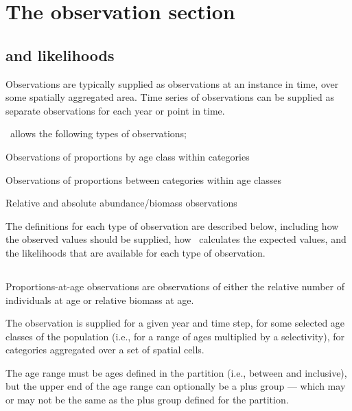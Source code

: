 \section{The observation section\label{sec:observation-section}}

\subsection{ and likelihoods\label{sec:likelihoods}}

Observations are typically supplied as observations at an instance in time, over some spatially aggregated area. Time series of observations can be supplied as separate observations for each year or point in time. 

\SPM\ allows the following types of observations;

\begin{description}
  \item Observations of proportions by age class within categories
  \item Observations of proportions between categories within age classes
  \item Relative and absolute abundance/biomass observations
\end{description}

The definitions for each type of observation are described below, including how the observed values should be supplied, how \SPM\ calculates the expected values, and the likelihoods that are available for each type of observation.

\subsection{}

Proportions-at-age observations are observations of either the relative number of individuals at age or relative biomass at age. 

The observation is supplied for a given year and time step, for some selected age classes of the population (i.e., for a range of ages multiplied by a selectivity), for categories aggregated over a set of spatial cells. 

The age range must be ages defined in the partition (i.e., between  and  inclusive), but the upper end of the age range can optionally be a plus group --- which may or may not be the same as the plus group defined for the partition. 

